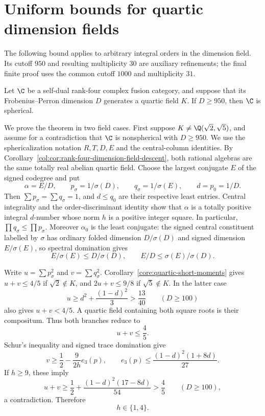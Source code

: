 \section{Uniform bounds for quartic dimension fields}\label{sec:quartic-bound}

The following bound applies to arbitrary integral orders in the
dimension field. Its cutoff $950$ and resulting multiplicity $30$
are auxiliary refinements; the final finite proof uses the common
cutoff $1000$ and multiplicity $31$.
\begin{theorem}\label{thm:quartic-uniform-bound}
Let $\C$ be a self-dual rank-four complex fusion category, and
suppose that its Frobenius--Perron dimension $D$ generates a quartic
field $K$. If $D\ge950$, then $\C$ is spherical.
\end{theorem}

We prove the theorem in two field cases. First suppose
$K\ne\Q(\sqrt2,\sqrt5)$, and assume for a contradiction that
$\C$ is nonspherical with $D\ge950$. We use the sphericalization notation $R,T,D,E$ and the
central-column identities. By
Corollary~\ref{col:cor:rank-four-dimension-field-descent}, both rational
algebras are the same totally real abelian quartic field. Choose the
largest conjugate $E$ of the signed codegree and put
\[
 \alpha=E/D,\qquad p_\sigma=1/\sigma(D),\qquad
 q_\sigma=1/\sigma(E),\qquad d=p_0=1/D.
\]
Then $\sum p_\sigma=\sum q_\sigma=1$, and $d\le q_0$ are their
respective least entries. Central integrality and the order-discriminant
identity show that $\alpha$ is a totally positive integral $d$-number
whose norm $h$ is a positive integer square. In particular,
$\prod q_\sigma\le\prod p_\sigma$. Moreover $\alpha_0$ is the least
conjugate: the signed central constituent labelled by $\sigma$ has
ordinary folded dimension $D/\sigma(D)$ and signed dimension
$E/\sigma(E)$, so spectral domination gives
\[
 E/\sigma(E)\le D/\sigma(D),\qquad
 E/D\le\sigma(E)/\sigma(D).
\]

Write $u=\sum p_\sigma^2$ and $v=\sum q_\sigma^2$.
Corollary~\ref{core:quartic-short-moments} gives $u+v\le4/5$ if
$\sqrt2\notin K$, and $2u+v\le9/8$ if $\sqrt5\notin K$.
In the latter case
\[
 u\ge d^2+\frac{(1-d)^2}{3}>\frac{13}{40}
 \qquad(D\ge100)
\]
also gives $u+v<4/5$. A quartic field containing both square roots
is their compositum. Thus both branches reduce to
\begin{equation}\label{eq:quartic-two-moments}
 u+v\le\frac45.
\end{equation}
Schur's inequality and signed trace domination give
\begin{equation}\label{eq:quartic-norm-estimates}
 v\ge\frac12-\frac9{2h}e_3(p),\qquad
 e_3(p)\le\frac{(1-d)^2(1+8d)}{27}.
\end{equation}
If $h\ge9$, these imply
\[
 u+v\ge\frac12+\frac{(1-d)^2(17-8d)}{54}>\frac45
 \qquad(D\ge100),
\]
a contradiction. Therefore
\begin{equation}\label{eq:quartic-small-norm}
 h\in\{1,4\}.
\end{equation}


